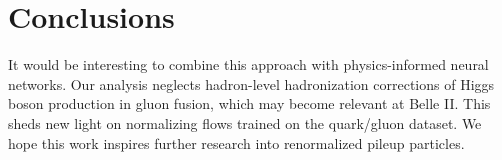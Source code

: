 \section{Conclusions}\label{sec:conclusions}

It would be interesting to combine this approach with physics-informed
neural networks. Our analysis neglects hadron-level hadronization
corrections of Higgs boson production in gluon fusion, which may become
relevant at Belle II. This sheds new light on normalizing flows trained
on the quark/gluon dataset. We hope this work inspires further research
into renormalized pileup particles.


